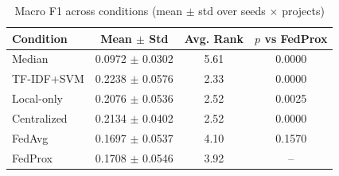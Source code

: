 \begin{table}[h]
\centering
\caption{Macro F1 across conditions (mean $\pm$ std over seeds $\times$ projects)}
\begin{tabular}{lccc}
\toprule
Condition & Mean $\pm$ Std & Avg. Rank & $p$ vs FedProx \\
\midrule
Median & 0.0972 $\pm$ 0.0302 & 5.61 & 0.0000 \\
TF-IDF+SVM & 0.2238 $\pm$ 0.0576 & 2.33 & 0.0000 \\
Local-only & 0.2076 $\pm$ 0.0536 & 2.52 & 0.0025 \\
Centralized & 0.2134 $\pm$ 0.0402 & 2.52 & 0.0000 \\
FedAvg & 0.1697 $\pm$ 0.0537 & 4.10 & 0.1570 \\
FedProx & 0.1708 $\pm$ 0.0546 & 3.92 & -- \\
\bottomrule
\end{tabular}
\end{table}
